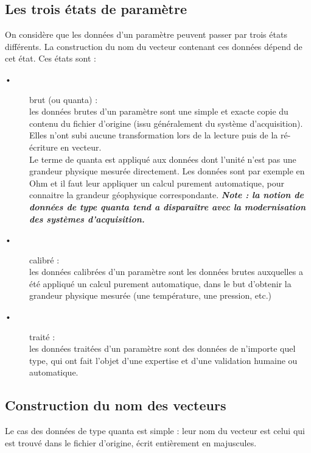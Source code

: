 
\subsection{Les trois états de paramètre}

On considère que les données d'un paramètre peuvent passer par trois états
différents.
La construction du nom du vecteur contenant ces données dépend de cet état.
Ces états sont :
\begin{description}
\item[•] {brut (ou quanta)} : \\
         les données brutes d'un paramètre sont une simple et exacte copie du
         contenu du fichier d'origine (issu généralement du système
         d'acquisition). Elles n'ont subi aucune transformation
         lors de la lecture puis de la ré-écriture en vecteur. \\
         Le terme de quanta est appliqué aux données dont l'unité n'est pas
         une grandeur physique mesurée directement. Les données sont par
         exemple en Ohm et il faut leur appliquer un calcul purement
         automatique, pour connaitre la grandeur géophysique correspondante.
         \textbf{\textit{Note : la notion de données de type quanta tend a
         disparaître avec la modernisation des systèmes d'acquisition.}}

\item[•] {calibré} : \\
         les données calibrées d'un paramètre sont les données brutes
         auxquelles a été appliqué un calcul purement automatique, dans le but
         d'obtenir la grandeur physique mesurée (une température,
         une pression, etc.)

\item[•] {traité} : \\
         les données traitées d'un paramètre sont des données de n'importe quel
         type, qui ont fait l'objet d'une expertise et d'une validation
         humaine ou automatique.
\end{description}


\subsection{Construction du nom des vecteurs}
Le cas des données de type quanta est simple : leur nom du vecteur est celui
qui est trouvé dans le fichier d'origine, écrit entièrement en majuscules. \\


